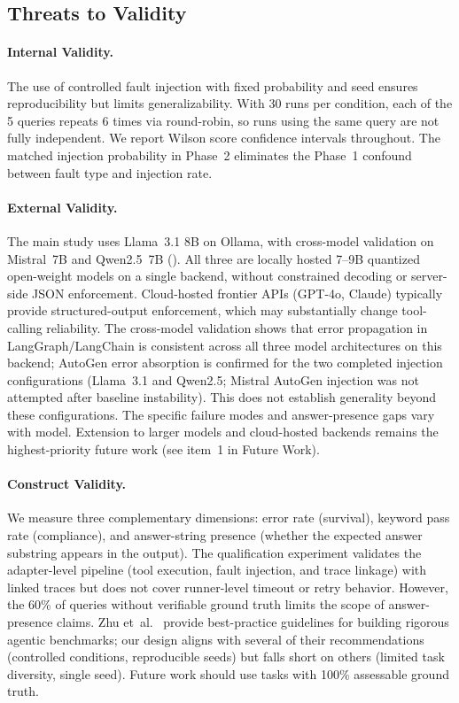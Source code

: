 \documentclass[make,article,submit,moreauthors,pdftex]{mdpi}
\begin{document}
\subsection{Threats to Validity}

\paragraph{Internal Validity.} {\color{magenta}The use of controlled fault injection with fixed probability and seed ensures reproducibility but limits generalizability. With 30 runs per condition, each of the 5 queries repeats 6 times via round-robin, so runs using the same query are not fully independent. We report Wilson score confidence intervals throughout. The matched injection probability in Phase~2 eliminates the Phase~1 confound between fault type and injection rate.}

\paragraph{External Validity.} {\color{magenta}The main study uses Llama~3.1 8B on Ollama, with cross-model validation on Mistral~7B and Qwen2.5~7B (). All three are locally hosted 7--9B quantized open-weight models on a single backend, without constrained decoding or server-side JSON enforcement. Cloud-hosted frontier APIs (GPT-4o, Claude) typically provide structured-output enforcement, which may substantially change tool-calling reliability. The cross-model validation shows that error propagation in LangGraph/LangChain is consistent across all three model architectures on this backend; AutoGen error absorption is confirmed for the two completed injection configurations (Llama~3.1 and Qwen2.5; Mistral AutoGen injection was not attempted after baseline instability). This does not establish generality beyond these configurations. The specific failure modes and answer-presence gaps vary with model. Extension to larger models and cloud-hosted backends remains the highest-priority future work (see item~1 in Future Work).}

\paragraph{Construct Validity.} {\color{magenta}We measure three complementary dimensions: error rate (survival), keyword pass rate (compliance), and answer-string presence (whether the expected answer substring appears in the output). The qualification experiment validates the adapter-level pipeline (tool execution, fault injection, and trace linkage) with linked traces but does not cover runner-level timeout or retry behavior. However, the 60\% of queries without verifiable ground truth limits the scope of answer-presence claims. Zhu et~al.~\cite{zhu2025benchmarking} provide best-practice guidelines for building rigorous agentic benchmarks; our design aligns with several of their recommendations (controlled conditions, reproducible seeds) but falls short on others (limited task diversity, single seed). Future work should use tasks with 100\% assessable ground truth.}
\end{document}
